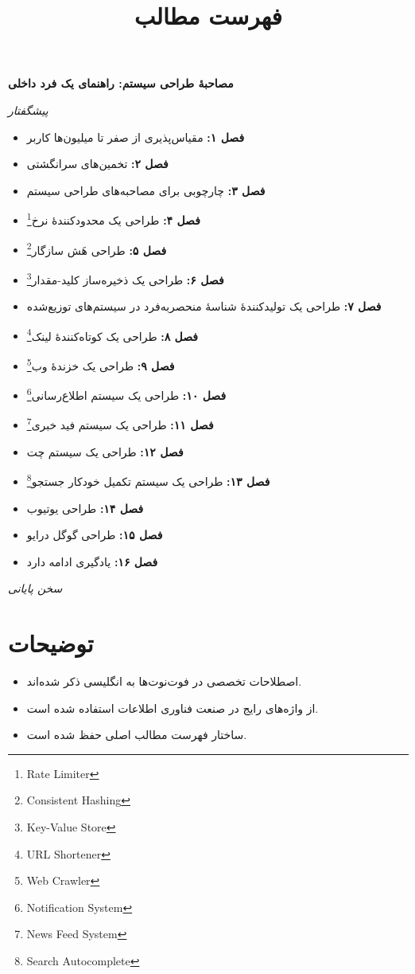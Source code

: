 \documentclass[12pt,a4paper]{article}
\title{فهرست مطالب}
\author{}
\date{}
\begin{document}
\maketitle

\textbf{مصاحبهٔ طراحی سیستم: راهنمای یک فرد داخلی}

\textit{پیشگفتار}

\begin{itemize}
\item \textbf{فصل ۱:} مقیاس‌پذیری از صفر تا میلیون‌ها کاربر
\item \textbf{فصل ۲:} تخمین‌های سرانگشتی
\item \textbf{فصل ۳:} چارچوبی برای مصاحبه‌های طراحی سیستم
\item \textbf{فصل ۴:} طراحی یک محدودکنندهٔ نرخ\footnote{Rate Limiter}
\item \textbf{فصل ۵:} طراحی هَش سازگار\footnote{Consistent Hashing}
\item \textbf{فصل ۶:} طراحی یک ذخیره‌ساز کلید-مقدار\footnote{Key-Value Store}
\item \textbf{فصل ۷:} طراحی یک تولیدکنندهٔ شناسهٔ منحصربه‌فرد در سیستم‌های توزیع‌شده
\item \textbf{فصل ۸:} طراحی یک کوتاه‌کنندهٔ لینک\footnote{URL Shortener}
\item \textbf{فصل ۹:} طراحی یک خزندهٔ وب\footnote{Web Crawler}
\item \textbf{فصل ۱۰:} طراحی یک سیستم اطلاع‌رسانی\footnote{Notification System}
\item \textbf{فصل ۱۱:} طراحی یک سیستم فید خبری\footnote{News Feed System}
\item \textbf{فصل ۱۲:} طراحی یک سیستم چت
\item \textbf{فصل ۱۳:} طراحی یک سیستم تکمیل خودکار جستجو\footnote{Search Autocomplete}
\item \textbf{فصل ۱۴:} طراحی یوتیوب
\item \textbf{فصل ۱۵:} طراحی گوگل درایو
\item \textbf{فصل ۱۶:} یادگیری ادامه دارد
\end{itemize}

\textit{سخن پایانی}

\section*{توضیحات}

\begin{itemize}
\item اصطلاحات تخصصی در فوت‌نوت‌ها به انگلیسی ذکر شده‌اند.
\item از واژه‌های رایج در صنعت فناوری اطلاعات استفاده شده است.
\item ساختار فهرست مطالب اصلی حفظ شده است.
\end{itemize}
\end{document}

